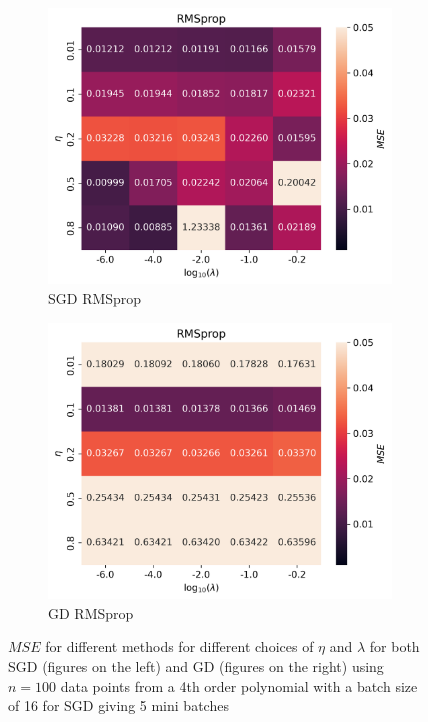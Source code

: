 \documentclass[11pt]{article}
\begin{document}
\begin{figure}[H]
    \begin{subfigure}{.5\textwidth}
        \centering
        \includegraphics[width=\textwidth]{../figures/RMSprop_SGD_eta_lmb.png}
        \caption{SGD RMSprop}
        \label{fig:}
    \end{subfigure}
    \begin{subfigure}{.5\textwidth}
        \centering
        \includegraphics[width=\textwidth]{../figures/RMSprop_GD_eta_lmb.png}
        \caption{GD RMSprop}
        \label{fig:}
    \end{subfigure}
    \caption{$MSE$ for different methods for different choices of $\eta$ and $\lambda$ for both SGD (figures on the left) and GD (figures on the right) using $n=100$ data points from a 4th order polynomial with a batch size of 16 for SGD giving 5 mini batches}
    \label{fig:compare_ridge}
\end{figure}
\end{document}

